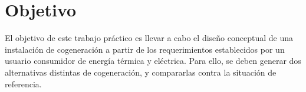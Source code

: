 \section{Objetivo}\label{sec:Objetivo}
El objetivo de este trabajo práctico es llevar a cabo el diseño conceptual de una instalación de cogeneración a partir de los requerimientos establecidos por un usuario consumidor de energía térmica y eléctrica. Para ello, se deben generar dos alternativas distintas de cogeneración, y compararlas contra la situación de referencia.